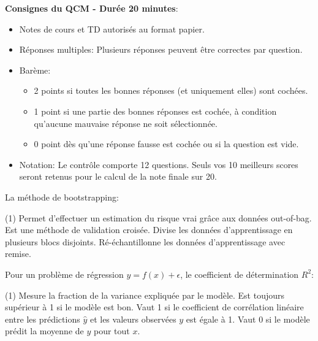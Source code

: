 \documentclass[solutions]{../cc}
\begin{document}
	
	\student
		
	\noindent \textbf{Consignes du QCM - Durée 20 minutes}:
	\begin{itemize}[nosep]
		\item Notes de cours et TD autorisés au format papier.
		\item Réponses multiples: Plusieurs réponses peuvent être correctes par question.
		\item Barème:
		\begin{itemize}[nosep]
			\item 2 points si toutes les bonnes réponses (et uniquement elles) sont cochées.
			\item 1 point si une partie des bonnes réponses est cochée, à condition qu'aucune mauvaise réponse ne soit sélectionnée.
			\item 0 point dès qu'une réponse fausse est cochée ou si la question est vide.
		\end{itemize}
		\item Notation: Le contrôle comporte 12 questions. Seuls vos 10 meilleurs scores seront retenus pour le calcul de la note finale sur 20.
	\end{itemize}

	\begin{question}
		La méthode de bootstrapping:
		\begin{tasks}(1)
			\task Permet d'effectuer un estimation du risque vrai grâce aux données out-of-bag.
			\task Est une méthode de validation croisée.
			\task Divise les données d'apprentissage en plusieurs blocs disjoints.
			\task Ré-échantillonne les données d'apprentissage avec remise.
		\end{tasks}
	\end{question}

	\begin{question}
		Pour un problème de régression $y = f(x) + \epsilon$, le coefficient de détermination $R^2$:
		\begin{tasks}(1)
			\task Mesure la fraction de la variance expliquée par le modèle.
			\task Est toujours supérieur à 1 si le modèle est bon.
			\task Vaut 1 si le coefficient de corrélation linéaire entre les prédictions $\hat{y}$ et les valeurs observées $y$ est égale à 1. 
			\task Vaut 0 si le modèle prédit la moyenne de $y$ pour tout $x$.
		\end{tasks}
	\end{question}
\end{document}
